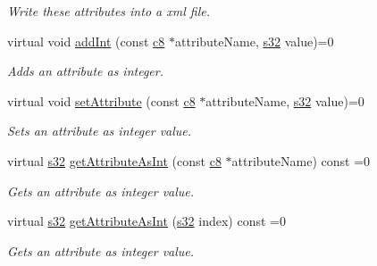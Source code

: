 \begin{DoxyCompactItemize}
\begin{DoxyCompactList}\small\item\em Write these attributes into a xml file. \end{DoxyCompactList}\item 
\mbox{\label{classirr_1_1io_1_1IAttributes_afbde111f36d59e9cf42b20595cf2ed24}} 
virtual void \hyperlink{classirr_1_1io_1_1IAttributes_afbde111f36d59e9cf42b20595cf2ed24}{add\+Int} (const \hyperlink{namespaceirr_a9395eaea339bcb546b319e9c96bf7410}{c8} $\ast$attribute\+Name, \hyperlink{namespaceirr_ac66849b7a6ed16e30ebede579f9b47c6}{s32} value)=0
\begin{DoxyCompactList}\small\item\em Adds an attribute as integer. \end{DoxyCompactList}\item 
\mbox{\label{classirr_1_1io_1_1IAttributes_a03fa31acb481ae23678676cc183f09a6}} 
virtual void \hyperlink{classirr_1_1io_1_1IAttributes_a03fa31acb481ae23678676cc183f09a6}{set\+Attribute} (const \hyperlink{namespaceirr_a9395eaea339bcb546b319e9c96bf7410}{c8} $\ast$attribute\+Name, \hyperlink{namespaceirr_ac66849b7a6ed16e30ebede579f9b47c6}{s32} value)=0
\begin{DoxyCompactList}\small\item\em Sets an attribute as integer value. \end{DoxyCompactList}\item 
virtual \hyperlink{namespaceirr_ac66849b7a6ed16e30ebede579f9b47c6}{s32} \hyperlink{classirr_1_1io_1_1IAttributes_ac6c51254c9d43cb58cb89866cdd210ed}{get\+Attribute\+As\+Int} (const \hyperlink{namespaceirr_a9395eaea339bcb546b319e9c96bf7410}{c8} $\ast$attribute\+Name) const =0
\begin{DoxyCompactList}\small\item\em Gets an attribute as integer value. \end{DoxyCompactList}\item 
virtual \hyperlink{namespaceirr_ac66849b7a6ed16e30ebede579f9b47c6}{s32} \hyperlink{classirr_1_1io_1_1IAttributes_a71aab77245c8cfc02b547d1031548006}{get\+Attribute\+As\+Int} (\hyperlink{namespaceirr_ac66849b7a6ed16e30ebede579f9b47c6}{s32} index) const =0
\begin{DoxyCompactList}\small\item\em Gets an attribute as integer value. \end{DoxyCompactList}\item 

\end{DoxyCompactItemize}

